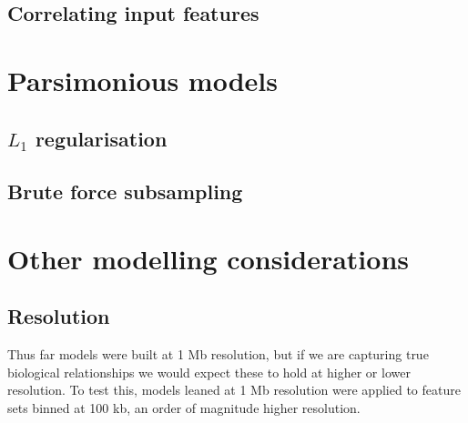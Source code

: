 \documentclass[a4paper,11pt,oneside]{book}
\begin{document}

\subsection{Correlating input features}\label{sec:corrinputs}

\section{Parsimonious models}

\subsection{$L_1$ regularisation}

\subsection{Brute force subsampling}

\section{Other modelling considerations}

\subsection{Resolution}

Thus far models were built at 1 Mb resolution, but if we are capturing true biological relationships we would expect these to hold at higher or lower resolution. To test this, models leaned at 1 Mb resolution were applied to feature sets binned at 100 kb, an order of magnitude higher resolution.
\end{document}
